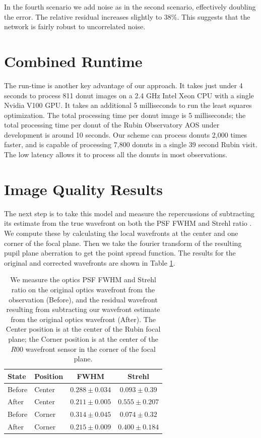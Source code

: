 In the fourth scenario we add noise as in the second scenario, effectively doubling the error. The relative residual increases slightly to 38\%. This suggests that the network is fairly robust to uncorrelated noise.

\section{Combined Runtime}

The run-time is another key advantage of our approach. It takes just under 4 seconds to process 811 donut images on a 2.4 GHz Intel Xeon CPU with a single Nvidia V100 GPU. It takes an additional 5 milliseconds to run the least squares optimization. The total processing time per donut image is 5 milliseconds; the total processing time per donut of the Rubin Observatory AOS under development is around 10 seconds\cite{2015Xin,2014Overiew}. Our scheme can process donuts 2,000 times faster, and is capable of processing 7,800 donuts in a single 39 second Rubin visit. The low latency allows it to process all the donuts in most observations.

\section{Image Quality Results}

The next step is to take this model and measure the repercussions of subtracting its estimate from the true wavefront on both the PSF FWHM and Strehl ratio \cite{strehl1895aplanatische}. We compute these by calculating the local wavefronts at the center and one corner of the focal plane. Then we take the fourier transform of the resulting pupil plane aberration to get the point spread function. The results for the original and corrected wavefronts are shown in Table \ref{tab:corrections}. 

\begin{table}
{
    \begin{center}
    \begin{tabular}{|l|l|c|c|}
    \hline
    State & Position & FWHM & Strehl\\
    \hline
    Before & Center & $0.288 \pm 0.034$ & $0.093 \pm 0.39$ \\
    After & Center & $0.211 \pm 0.005$ &  $0.555 \pm 0.207$\\
    \hline
    Before & Corner & $0.314 \pm 0.045$ & $0.074 \pm 0.32$\\
    After & Corner & $0.215 \pm 0.009$ & $0.400 \pm 0.184$\\
    \hline
    \end{tabular}
    \end{center}
}
\caption[Improvements To The Optics PSF FWHM And Strehl Ratio]{We measure the optics PSF FWHM and Strehl ratio on the original optics wavefront from the observation (Before), and the residual wavefront resulting from subtracting our wavefront estimate from the original optics wavefront (After). The Center position is at the center of the Rubin focal plane; the Corner position is at the center of the $R00$ wavefront sensor in the corner of the focal plane.}
\label{tab:corrections}
\end{table}


